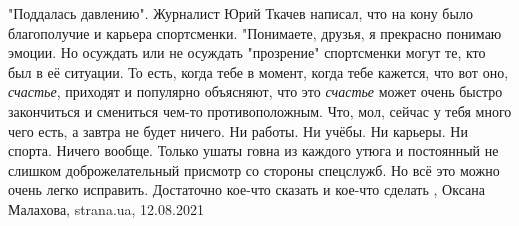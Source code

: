 "Поддалась давлению".  Журналист Юрий Ткачев написал, что на кону было
благополучие и карьера спортсменки.  "Понимаете, друзья, я прекрасно понимаю
эмоции. Но осуждать или не осуждать "прозрение" спортсменки могут те, кто был в
её ситуации. То есть, когда тебе в момент, когда тебе кажется, что вот оно,
\emph{счастье}, приходят и популярно объясняют, что это \emph{счастье} может очень быстро
закончиться и смениться чем-то противоположным. Что, мол, сейчас у тебя много
чего есть, а завтра не будет ничего.  Ни работы. Ни учёбы. Ни карьеры. Ни
спорта. Ничего вообще. Только ушаты говна из каждого утюга и постоянный не
слишком доброжелательный присмотр со стороны спецслужб.  Но всё это можно очень
легко исправить. Достаточно кое-что сказать и кое-что сделать
, 
Оксана Малахова, strana.ua, 12.08.2021
